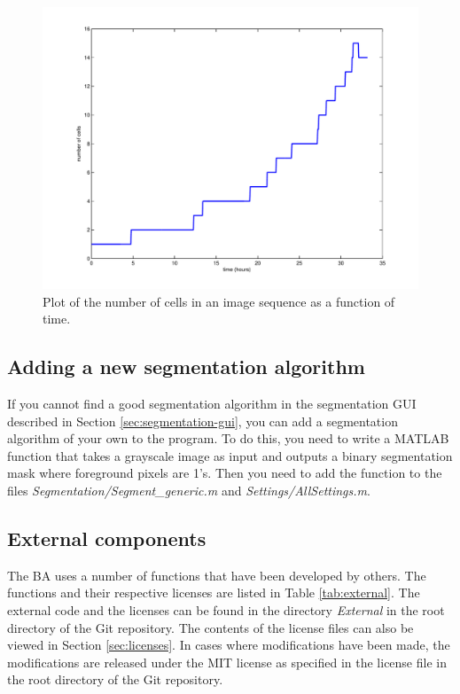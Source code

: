 \documentclass[a4paper, oneside, onecolumn, 11pt]{article}
\newcommand{\file}[1]{\emph{#1}}
\begin{document}
\begin{figure}[!htb]
\begin{center}
\includegraphics[width = 0.75\columnwidth]{figures/countPlot}
\caption{Plot of the number of cells in an image sequence as a function of time.}
\label{fig:count-plot}
\end{center}
\end{figure}

\subsection{Adding a new segmentation algorithm}
If you cannot find a good segmentation algorithm in the segmentation GUI described in Section \ref{sec:segmentation-gui}, you can add a segmentation algorithm of your own to the program. To do this, you need to write a MATLAB function that takes a grayscale image as input and outputs a binary segmentation mask where foreground pixels are 1's. Then you need to add the function to the files \file{Segmentation/\allowbreak Segment\_generic.m} and \file{Settings/\allowbreak AllSettings.m}.

\subsection{External components}
\label{sec:external}
The BA uses a number of functions that have been developed by others. The functions and their respective licenses are listed in Table \ref{tab:external}. The external code and the licenses can be found in the directory \file{External} in the root directory of the Git repository. The contents of the license files can also be viewed in Section \ref{sec:licenses}. In cases where modifications have been made, the modifications are released under the MIT license as specified in the license file in the root directory of the Git repository.
\end{document}
